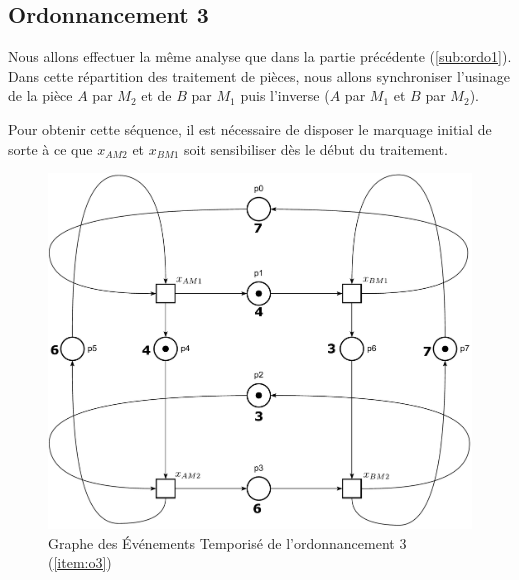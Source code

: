 \subsection{Ordonnancement 3}
Nous allons effectuer la même analyse que dans la partie précédente (\ref{sub:ordo1}). Dans cette répartition des traitement de pièces, nous allons synchroniser l'usinage de la pièce $A$ par $M_2$ et de $B$ par $M_1$ puis l'inverse ($A$ par $M_1$ et $B$ par $M_2$). 

Pour obtenir cette séquence, il est nécessaire de disposer le marquage initial de sorte à ce que $x_{AM2}$ et $x_{BM1}$ soit sensibiliser dès le début du traitement.
\begin{figure}[!ht]
\centering
\includegraphics[width = \textwidth]{./II/images/GET_3.pdf}
\caption{\label{fig:get} Graphe des Événements Temporisé de l'ordonnancement 3 (\ref{item:o3})}
\end{figure}

